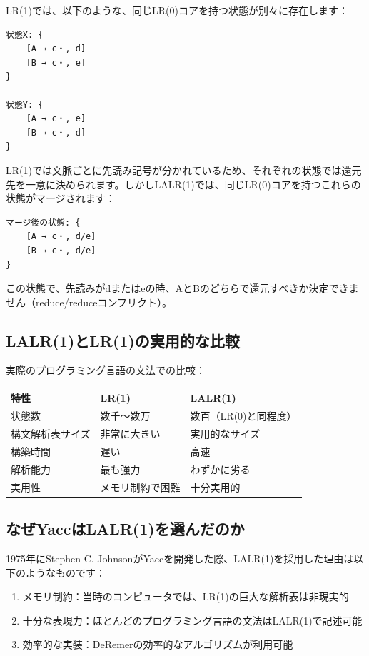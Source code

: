 LR(1)では、以下のような、同じLR(0)コアを持つ状態が別々に存在します：

\begin{verbatim}
状態X: {
    [A → c・, d]
    [B → c・, e]
}

状態Y: {
    [A → c・, e]
    [B → c・, d]
}
\end{verbatim}

LR(1)では文脈ごとに先読み記号が分かれているため、それぞれの状態では還元先を一意に決められます。しかしLALR(1)では、同じLR(0)コアを持つこれらの状態がマージされます：

\begin{verbatim}
マージ後の状態: {
    [A → c・, d/e]
    [B → c・, d/e]
}
\end{verbatim}

この状態で、先読みがdまたはeの時、AとBのどちらで還元すべきか決定できません（reduce/reduceコンフリクト）。

\hypertarget{chapter5-lalr1ux3068lr1ux306eux5b9fux7528ux7684ux306aux6bd4ux8f03}{%
\subsection{LALR(1)とLR(1)の実用的な比較}\label{chapter5-lalr1ux3068lr1ux306eux5b9fux7528ux7684ux306aux6bd4ux8f03}}

実際のプログラミング言語の文法での比較：

\begin{longtable}[]{@{}lll@{}}
\toprule
特性 & LR(1) & LALR(1)\tabularnewline
\midrule
\endhead
状態数 & 数千～数万 & 数百（LR(0)と同程度）\tabularnewline
構文解析表サイズ & 非常に大きい & 実用的なサイズ\tabularnewline
構築時間 & 遅い & 高速\tabularnewline
解析能力 & 最も強力 & わずかに劣る\tabularnewline
実用性 & メモリ制約で困難 & 十分実用的\tabularnewline
\bottomrule
\end{longtable}

\hypertarget{chapter5-ux306aux305cyaccux306flalr1ux3092ux9078ux3093ux3060ux306eux304b}{%
\subsection{なぜYaccはLALR(1)を選んだのか}\label{chapter5-ux306aux305cyaccux306flalr1ux3092ux9078ux3093ux3060ux306eux304b}}

1975年にStephen C.
JohnsonがYaccを開発した際、LALR(1)を採用した理由は以下のようなものです：

\begin{enumerate}
\def\labelenumi{\arabic{enumi}.}
\tightlist
\item
  メモリ制約：当時のコンピュータでは、LR(1)の巨大な解析表は非現実的
\item
  十分な表現力：ほとんどのプログラミング言語の文法はLALR(1)で記述可能
\item
  効率的な実装：DeRemerの効率的なアルゴリズムが利用可能
\end{enumerate}

